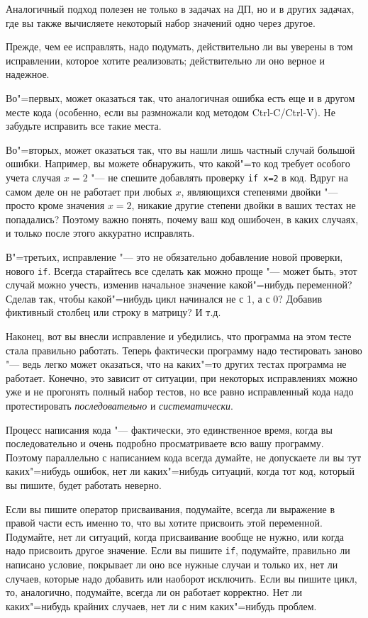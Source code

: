 \documentclass[a4paper,10pt]{problems}
\begin{document}
Аналогичный подход полезен не только в задачах на ДП, но и в других задачах, где вы также вычисляете некоторый набор значений одно через другое.

Прежде, чем ее исправлять, надо подумать, действительно ли вы уверены в том исправлении, которое хотите реализовать; действительно ли оно верное и надежное.

Во"=первых, может оказаться так, что аналогичная ошибка есть еще и в другом месте кода (особенно, если вы размножали код методом Ctrl-C/Ctrl-V).
Не забудьте исправить все такие места.

Во"=вторых, может оказаться так, что вы нашли лишь частный случай большой ошибки. 
Например, вы можете обнаружить, что какой"=то код требует особого учета случая $x=2$ "--- не спешите добавлять проверку \verb`if x=2` в код.
Вдруг на самом деле он не работает при любых $x$, являющихся степенями двойки "--- просто кроме значения $x=2$, никакие другие степени двойки
в ваших тестах не попадались? Поэтому важно понять, почему ваш код ошибочен, в каких случаях, и только после этого аккуратно исправлять.

В"=третьих, исправление "--- это не обязательно добавление новой проверки, нового \verb`if`. 
Всегда старайтесь все сделать как можно проще "--- может быть, этот случай можно учесть, изменив начальное значение какой"=нибудь переменной?
Сделав так, чтобы какой"=нибудь цикл начинался не с 1, а с 0? Добавив фиктивный столбец или строку в матрицу? И т.д.

Наконец, вот вы внесли исправление и убедились, что программа на этом тесте стала правильно работать.
Теперь фактически программу надо тестировать заново "--- ведь легко может оказаться, что на каких"=то других тестах программа не работает.
Конечно, это зависит от ситуации, при некоторых исправлениях можно уже и не прогонять полный набор тестов, но все равно исправленный кода надо
протестировать \textit{последовательно} и \textit{систематически}.

Процесс написания кода "--- фактически, это единственное время, когда вы последовательно и очень подробно просматриваете всю вашу программу.
Поэтому параллельно с написанием кода всегда думайте, не допускаете ли вы тут каких"=нибудь ошибок, нет ли каких"=нибудь ситуаций, 
когда тот код, который вы пишите, будет работать неверно.

Если вы пишите оператор присваивания, подумайте, всегда ли выражение в правой части есть именно то, что вы хотите присвоить этой переменной. 
Подумайте, нет ли ситуаций, когда присваивание вообще не нужно, или когда надо присвоить другое значение. 
Если вы пишите \verb'if', подумайте, правильно ли написано условие, покрывает ли оно все нужные случаи и только их, нет ли случаев, которые надо добавить
или наоборот исключить.
Если вы пишите цикл, то, аналогично, подумайте, всегда ли он работает корректно. 
Нет ли каких"=нибудь крайних случаев, нет ли с ним каких"=нибудь проблем.
\end{document}
